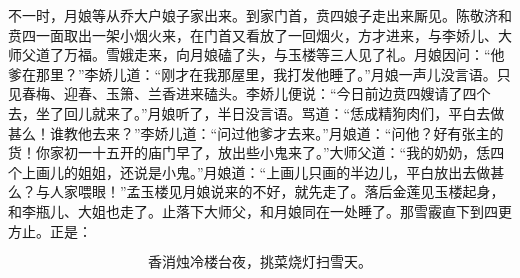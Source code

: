 不一时，月娘等从乔大户娘子家出来。到家门首，贲四娘子走出来厮见。陈敬济和贲四一面取出一架小烟火来，在门首又看放了一回烟火，方才进来，与李娇儿、大师父道了万福。雪娥走来，向月娘磕了头，与玉楼等三人见了礼。月娘因问：“他爹在那里？”李娇儿道：“刚才在我那屋里，我打发他睡了。”月娘一声儿没言语。只见春梅、迎春、玉箫、兰香进来磕头。李娇儿便说：“今日前边贲四嫂请了四个去，坐了回儿就来了。”月娘听了，半日没言语。骂道：“恁成精狗肉们，平白去做甚么！谁教他去来？”李娇儿道：“问过他爹才去来。”月娘道：“问他？好有张主的货！你家初一十五开的庙门早了，放出些小鬼来了。”大师父道：“我的奶奶，恁四个上画儿的姐姐，还说是小鬼。”月娘道：“上画儿只画的半边儿，平白放出去做甚么？与人家喂眼！”孟玉楼见月娘说来的不好，就先走了。落后金莲见玉楼起身，和李瓶儿、大姐也走了。止落下大师父，和月娘同在一处睡了。那雪霰直下到四更方止。正是：

\[
香消烛冷楼台夜，挑菜烧灯扫雪天。
\]

